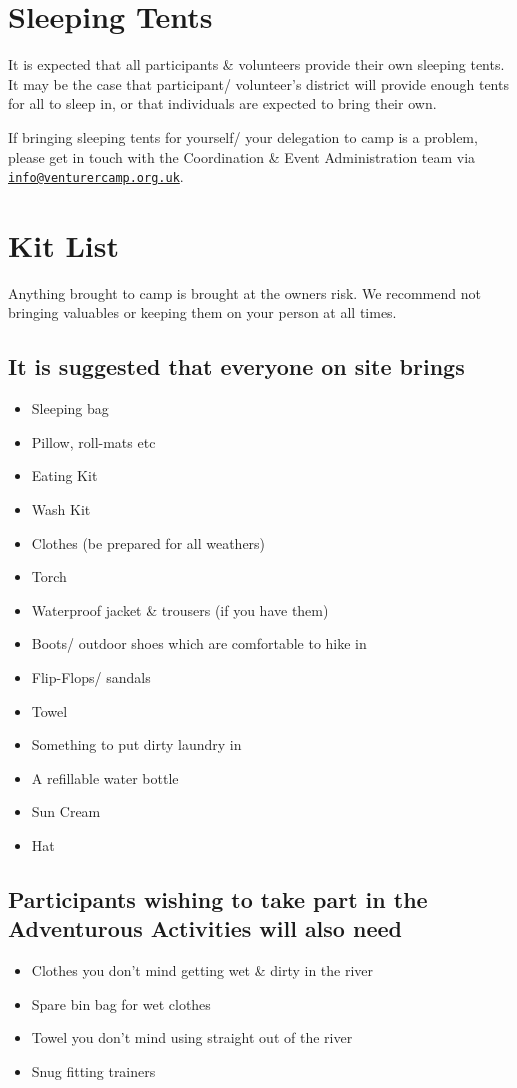 \documentclass[a4paper, 11pt]{report}
\newcommand{\nl}{\newline}
\begin{document}
\section{Sleeping Tents}
It is expected that all participants \& volunteers provide their own sleeping tents. It may be the case that participant/ volunteer's district will provide enough tents for all to sleep in, or that individuals are expected to bring their own.\nl

If bringing sleeping tents for yourself/ your delegation to camp is a problem, please get in touch with the Coordination \& Event Administration team via \href{mailto:info@venturercamp.org.uk}{\texttt{info@venturercamp.org.uk}}.

\section{Kit List}
Anything brought to camp is brought at the owners risk. We recommend not bringing valuables or keeping them on your person at all times.
\subsection{It is suggested that everyone on site brings}
\begin{itemize}
    \item Sleeping bag
    \item Pillow, roll-mats etc
    \item Eating Kit
    \item Wash Kit
    \item Clothes (be prepared for all weathers)
    \item Torch
    \item Waterproof jacket \& trousers (if you have them)
    \item Boots/ outdoor shoes which are comfortable to hike in
    \item Flip-Flops/ sandals
    \item Towel
    \item Something to put dirty laundry in
    \item A refillable water bottle
    \item Sun Cream
    \item Hat
\end{itemize}
\subsection{Participants wishing to take part in the Adventurous Activities will also need}
\begin{itemize}
    \item Clothes you don't mind getting wet \& dirty in the river
    \item Spare bin bag for wet clothes
    \item Towel you don't mind using straight out of the river
    \item Snug fitting trainers
\end{itemize}
\end{document}
